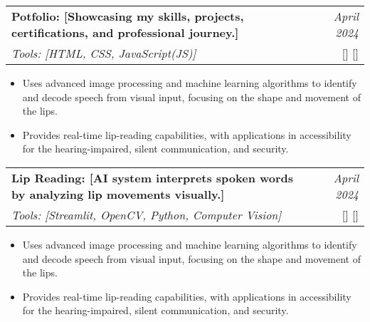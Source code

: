 \documentclass[a4paper,11pt]{article}
\makeatletter
\newcommand{\resumeProject}[4]{
\vspace{0.5mm}\item
    \begin{tabular*}{0.98\textwidth}[t]{l@{\extracolsep{\fill}}r}
        \textbf{#1} & \textit{\footnotesize{#3}} \\
        \footnotesize{\textit{#2}} & \footnotesize{#4}
    \end{tabular*}
    \vspace{-2.4mm}
}
\newcommand{\resumeItemListStart}{\begin{itemize}[leftmargin=*,labelsep=1mm,itemsep=0.5mm]}
\newcommand{\resumeItemListEnd}{\end{itemize}\vspace{-2mm}}
\makeatother
\begin{document}
\resumeProject
  {Potfolio: [Showcasing my skills, projects, certifications, and professional journey.]}
  {Tools: [HTML, CSS, JavaScript(JS)]}
  {April 2024}
  {{
    [\href{https://github.com/Lns9777/Portfolio}{\textcolor{darkblue}{\faGithub}}]
    [\href{https://portfolio-wheat-nine-42.vercel.app/}{\textcolor{darkblue}{\faLink}}]
  }}
\resumeItemListStart
    \item Uses advanced image processing and machine learning algorithms to identify and decode speech from visual input, focusing on the shape and movement of the lips.
    \item Provides real-time lip-reading capabilities, with applications in accessibility for the hearing-impaired, silent communication, and security.
\resumeItemListEnd
\resumeProject
  {Lip Reading: [AI system interprets spoken words by analyzing lip movements visually.]}
  {Tools: [Streamlit, OpenCV, Python, Computer Vision]}
  {April 2024}
  {{
    [\href{https://github.com/Lns9777/LipReading}{\textcolor{darkblue}{\faGithub}}]
    [\href{https://lipreading-lns.streamlit.app/}{\textcolor{darkblue}{\faLink}}]
  }}
\resumeItemListStart
    \item Uses advanced image processing and machine learning algorithms to identify and decode speech from visual input, focusing on the shape and movement of the lips.
    \item Provides real-time lip-reading capabilities, with applications in accessibility for the hearing-impaired, silent communication, and security.
\resumeItemListEnd
\end{document}
